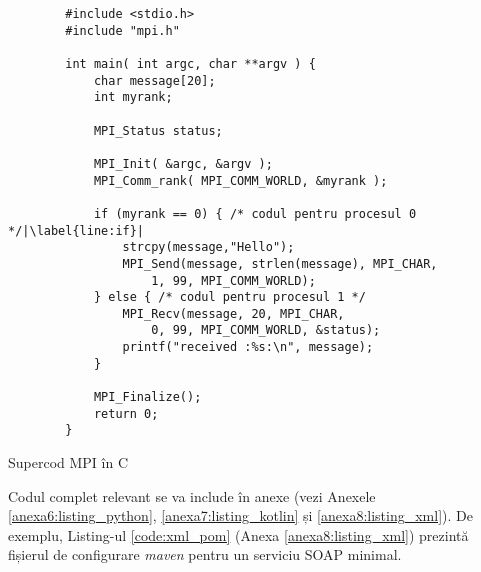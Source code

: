 \begin{code}
    \begin{verbatim}
        #include <stdio.h>
        #include "mpi.h"
        
        int main( int argc, char **argv ) {
        	char message[20];
        	int myrank;	
        		
        	MPI_Status status;
        
        	MPI_Init( &argc, &argv );
        	MPI_Comm_rank( MPI_COMM_WORLD, &myrank );
        	
        	if (myrank == 0) { /* codul pentru procesul 0 */|\label{line:if}|
        		strcpy(message,"Hello");
        		MPI_Send(message, strlen(message), MPI_CHAR, 
        			1, 99, MPI_COMM_WORLD);
        	} else { /* codul pentru procesul 1 */
        		MPI_Recv(message, 20, MPI_CHAR, 
        			0, 99, MPI_COMM_WORLD, &status);
        		printf("received :%s:\n", message);
        	}
        	
        	MPI_Finalize();
        	return 0;
        }
    \end{verbatim}
    \caption{Supercod MPI în C} 
    \label{code:c_mpi}
\end{code}

Codul complet relevant se va include în anexe (vezi Anexele \ref{anexa6:listing_python}, \ref{anexa7:listing_kotlin} și \ref{anexa8:listing_xml}). De exemplu, Listing-ul \ref{code:xml_pom} (Anexa \ref{anexa8:listing_xml}) prezintă fișierul de configurare \textit{maven} pentru un serviciu SOAP minimal.

\textcolor{gray}{\lipsum}

\textcolor{gray}{\lipsum}
\fi
